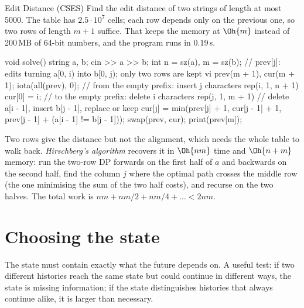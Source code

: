 \begin{problem}{Edit Distance (CSES)}
Find the edit distance of two strings of length at most 5000.
\solution The table has $2.5 \cdot 10^7$ cells; each row depends only on the previous one, so two rows of length $m + 1$ suffice.
That keeps the memory at $\Oh{m}$ instead of 200\,MB of 64-bit numbers, and the program runs in 0.19\,s.
\end{problem}

\begin{code}
void solve() {
    string a, b;
    cin >> a >> b;
    int n = sz(a), m = sz(b);
    // prev[j]: edits turning a[0, i) into b[0, j); only two rows are kept
    vi prev(m + 1), cur(m + 1);
    iota(all(prev), 0);  // from the empty prefix: insert j characters
    rep(i, 1, n + 1) {
        cur[0] = i;  // to the empty prefix: delete i characters
        rep(j, 1, m + 1)  // delete a[i - 1], insert b[j - 1], replace or keep
            cur[j] = min({prev[j] + 1, cur[j - 1] + 1,
                          prev[j - 1] + (a[i - 1] != b[j - 1])});
        swap(prev, cur);
    }
    print(prev[m]);
}
\end{code}

\usetemplate{LCS + edit distance}{Ctrl+Alt+T, [}{cplcs}

\begin{trick}
Two rows give the distance but not the alignment, which needs the whole table to walk back. \emph{Hirschberg's algorithm} recovers
it in $\Oh{nm}$ time and $\Oh{n + m}$ memory: run the two-row DP forwards on the first half of $a$ and backwards on the second half,
find the column $j$ where the optimal path crosses the middle row (the one minimising the sum of the two half costs), and recurse
on the two halves. The total work is $nm + nm/2 + nm/4 + \dots < 2nm$.
\end{trick}

\section[Choosing the state]{Choosing the state \hfill \gold}\label{sec:dp-state}

The state must contain exactly what the future depends on. A useful test: if two different histories reach the same state but
could continue in different ways, the state is missing information; if the state distinguishes histories that always continue
alike, it is larger than necessary.

